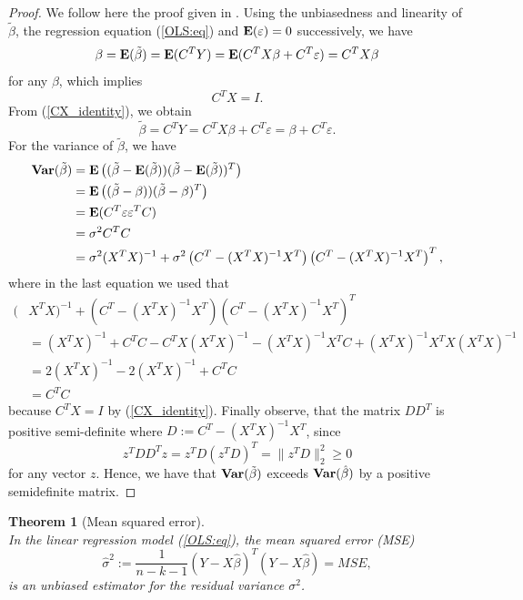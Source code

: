 \documentclass[a4paper, 12pt]{scrreprt}
\newtheorem{Theorem}{Theorem}[chapter]
\newcommand{\ew}{\mbox{\textbf{E}}}
\newcommand{\var}{\mbox{\textbf{Var}}}
\newcommand{\norm}{\|}
\begin{document}
\begin{proof} We follow here the proof given in \textcite[theorem 1.2.1]{ameniya1985advance}.
Using the unbiasedness and linearity of $\tilde{\beta}$, the regression equation (\ref{OLS:eq}) and $\ew(\varepsilon) = 0$ successively, we have
\begin{equation}
\beta = \ew(\tilde{\beta}) = \ew(C^T Y) = \ew(C^T X \beta + C^T \varepsilon ) = C^T X \beta
\end{equation}
for any $\beta$, which implies
\begin{equation}\label{CX_identity}
C^T X = I.
\end{equation}
From (\ref{CX_identity}), we obtain
\begin{equation}\label{beta_tilde}
\tilde{\beta} = C^T Y = C^T X \beta + C^T \varepsilon = \beta + C^T \varepsilon.
\end{equation}
For the variance of $\tilde{\beta}$, we have
\begin{align*}
\var(\tilde{\beta}) &= \ew\left(  (\tilde{\beta} - \ew(\tilde{\beta}))(\tilde{\beta} - \ew(\tilde{\beta}))^T  \right)  \\
&= \ew\left(  (\tilde{\beta} - \beta))(\tilde{\beta} - \beta)^T  \right) \\
&= \ew(C^T \varepsilon \varepsilon^T C) \\ 
&= \sigma^2 C^T C \\
&= \sigma^2 (X^T X)^{-1} + \sigma^2 \left( C^T - (X^T X)^{-1} X^T \right) \left( C^T - (X^T X)^{-1} X^T \right)^T,
\end{align*}
where in the last equation we used that 
\begin{align*}
(&X^T X)^{-1} + \left( C^T - (X^T X)^{-1} X^T \right) \left( C^T - (X^T X)^{-1} X^T \right)^T \\ 
&= (X^T X)^{-1} + C^T C - C^T X(X^T X)^{-1} - (X^T X)^{-1} X^T C + (X^T X)^{-1} X^T X (X^T X)^{-1} \\
&= 2(X^T X)^{-1} - 2(X^T X)^{-1}  +  C^T C \\
&= C^T C
\end{align*}
because $C^T X = I$ by (\ref{CX_identity}).
Finally observe, that the matrix $DD^T$ is positive semi-definite where $D:=  C^T - (X^T X)^{-1} X^T$, since 
\[ z^T D D^T z = z^T D (z^T D)^T = \norm z^T D \norm_2^2 \geq 0 \]
for any vector $z$. Hence, we have that $\var(\tilde{\beta})$ exceeds $\var(\hat{\beta})$ by a positive semidefinite matrix.
\end{proof}

\begin{Theorem}[Mean squared error] \label{MSE} $\text{ }$ \\ \upshape
In the linear regression model (\ref{OLS:eq}), the mean squared error (MSE) 
\begin{equation}\label{sigmahat}
\hat{\sigma}^2 := \frac{1}{n-k-1} (Y-X \hat{\beta})^T (Y-X\hat{\beta}) = MSE,
\end{equation}
is an unbiased estimator for the residual variance $\sigma^2$.
\end{Theorem}
\end{document}
